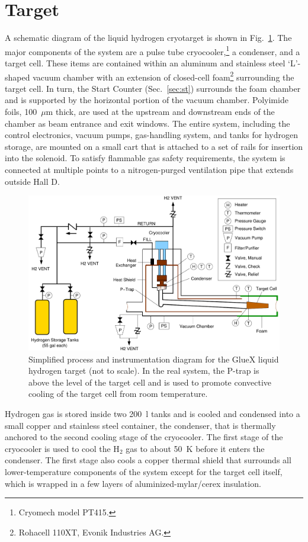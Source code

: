 \section[Target]{Target \label{sec:target} }
A schematic diagram of the \gx{} liquid hydrogen cryotarget is shown in Fig.~\ref{fig:Target}. The major components of the system are a pulse tube cryocooler,\footnote{Cryomech model PT415.} a condenser, and a target cell.  These items are contained within an aluminum and stainless steel `L'-shaped vacuum chamber with an extension of closed-cell foam\footnote{Rohacell 110XT, Evonik Industries AG.} surrounding the target cell. In turn, the \gx{} Start Counter (Sec.~\ref{sec:st}) surrounds the foam chamber and is supported by the horizontal portion of the vacuum chamber. Polyimide foils, 100~$\mu$m thick, are used at the upstream and downstream ends of the chamber as beam entrance and exit windows. The entire system, including the control electronics, vacuum pumps, gas-handling system, and tanks for hydrogen storage, are mounted on a small cart that is attached to a set of rails for insertion into the \gx{} solenoid.  To satisfy flammable gas safety requirements, the system is connected at multiple points to a nitrogen-purged ventilation pipe that extends outside Hall D.
\begin{figure}
\begin{center}
\includegraphics[width=4.5in]{figures/TargetSchematic3.pdf}
\end{center}
\caption{Simplified process and instrumentation diagram for the GlueX liquid hydrogen target (not to scale).
In the real system, the P-trap is above the level of the target cell and is used to
promote convective cooling of the target cell from room temperature.}
\label{fig:Target}
\end{figure}

Hydrogen gas is stored inside two 200~l tanks and
is cooled and condensed into a small copper and stainless steel container,
the condenser, that is thermally anchored to the second cooling stage of the cryocooler. 
The first stage of the cryocooler is used to
cool the H$_2$ gas to about 50~K before it enters the condenser.
The first stage also cools a copper thermal shield that surrounds all
lower-temperature components of the system except for the
target cell itself, which is wrapped in a few layers of aluminized-mylar/cerex insulation.

